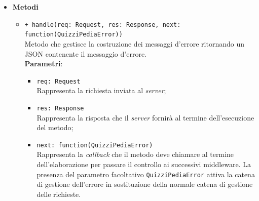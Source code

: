 \begin{itemize}
\begin{itemize}
	\end{itemize}
	\item \textbf{Metodi}\\
	\begin{itemize}
		\item \texttt{+ handle(req: Request, res: Response, next: function(QuizziPediaError))}\\
		Metodo che gestisce la costruzione dei messaggi d'errore ritornando un JSON contenente il messaggio d'errore.\\
		\textbf{Parametri}:
		\begin{itemize}
			\item \texttt{req: Request}\\
			Rappresenta la richiesta inviata al \textit{server};
			\item \texttt{res: Response}\\
			Rappresenta la risposta che il \textit{server} fornirà al termine dell'esecuzione del metodo;
			\item \texttt{next: function(QuizziPediaError)}\\
			Rappresenta la \textit{callback} che il metodo deve chiamare al termine dell'elaborazione per passare il controllo ai successivi middleware. La presenza del parametro facoltativo \texttt{QuizziPediaError} attiva la catena di gestione dell'errore in sostituzione della normale catena di gestione delle richieste.
		\end{itemize}
	\end{itemize}
\end{itemize}

